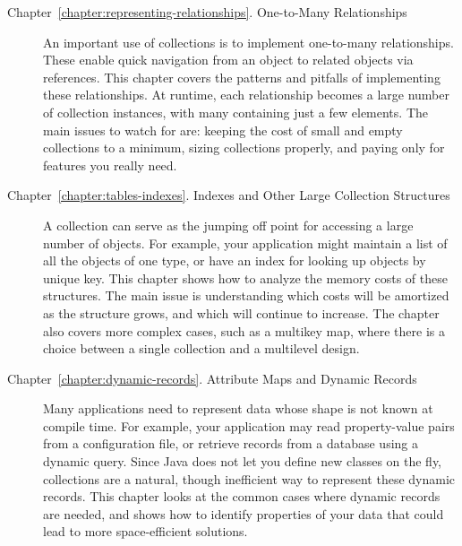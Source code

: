 \begin{description}
\item[Chapter~\ref{chapter:representing-relationships}.
One-to-Many Relationships] An important use of collections is to
implement one-to-many relationships. These enable quick navigation from an
object to related objects via references. This chapter covers the patterns and pitfalls of
implementing these relationships. At runtime, each relationship
becomes a large number of collection instances, with many containing just a few elements.
The main issues to watch for
are: keeping the cost of small and empty collections to a minimum, sizing
collections properly, and paying only for features you really need.

\item[Chapter~\ref{chapter:tables-indexes}. Indexes and Other Large Collection
Structures] A collection can serve as the jumping off
point for accessing a large number of objects. For example, your application
might maintain a list of all the objects of one type, or have an index for
looking up objects by unique key. This chapter shows how to analyze the memory
costs of these structures. The main
issue is understanding which costs will be amortized as the structure grows, and
which will continue to increase. The chapter also covers more complex cases,
such as a multikey map, where there is a choice between a single collection and a multilevel design.

\item[Chapter~\ref{chapter:dynamic-records}. Attribute Maps and Dynamic
Records] Many applications need to represent data whose shape is not
known at compile time. For example, your application may read property-value
pairs from a configuration file, or retrieve records from a database
using a dynamic query. Since Java does not let you define new classes on the
fly, collections are a natural, though inefficient way to represent
these dynamic records. This chapter looks at the common cases where dynamic records
are needed, and shows how to identify properties of your data that could lead to
more space-efficient solutions.


\end{description}

